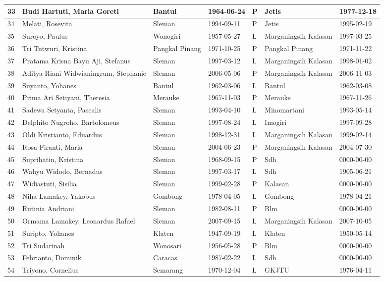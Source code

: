 \begin{longtable}{|m{5mm}|m{45mm}|m{20mm}|m{20mm}|m{5mm}|m{25mm}|m{20mm}|}
	33&Budi Hartuti, Maria Goreti&Bantul&1964-06-24&P&Jetis&1977-12-18\\ \hline 
	34&Melati, Rosevita&Sleman&1994-09-11&P&Jetis&1995-02-19\\ \hline 
	35&Suroyo, Paulus&Wonogiri&1957-05-27&L&Marganingsih Kalasan&1997-03-25\\ \hline 
	36&Tri Tutwuri, Kristina&Pangkal Pinang&1971-10-25&P&Pangkal Pinang&1971-11-22\\ \hline 
	37&Pratama Krisna Bayu Aji, Stefanus&Sleman&1997-03-12&L&Marganingsih Kalasan&1998-01-02\\ \hline 
	38&Aditya Riani Widwianingrum, Stephanie&Sleman&2006-05-06&P&Marganingsih Kalasan&2006-11-03\\ \hline 
	39&Suyanto, Yohanes&Bantul&1962-03-06&L&Bantul&1962-03-08\\ \hline 
	40&Prima Ari Setiyani, Theresia&Merauke&1967-11-03&P&Merauke&1967-11-26\\ \hline 
	41&Sadewa Setyanta, Pascalis&Sleman&1993-04-10&L&Minomartani&1993-05-14\\ \hline 
	42&Delphito Nugroho, Bartolomeus&Sleman&1997-08-24&L&Imogiri&1997-09-28\\ \hline 
	43&Oldi Kristianto, Eduardus&Sleman&1998-12-31&L&Marganingsih Kalasan&1999-02-14\\ \hline 
	44&Rosa Firanti, Maria&Sleman&2004-06-23&P&Marganingsih Kalasan&2004-07-30\\ \hline 
	45&Suprihatin, Kristina&Sleman&1968-09-15&P&Sdh&0000-00-00\\ \hline 
	46&Wahyu Widodo, Bernadus&Sleman&1997-03-17&L&Sdh&1905-06-21\\ \hline 
	47&Widiastuti, Sisilia&Sleman&1999-02-28&P&Kalasan&0000-00-00\\ \hline 
	48&Niha Lamakey, Yakobus&Gombong&1978-04-05&L&Gombong&1978-04-21\\ \hline 
	49&Rutinia Andriani&Sleman&1982-08-11&P&Blm&0000-00-00\\ \hline 
	50&Ormama Lamakey, Leonardus Rafael&Sleman&2007-09-15&L&Marganingsih Kalasan&2007-10-05\\ \hline 
	51&Suripto, Yohanes&Klaten&1947-09-19&L&Klaten&1950-05-14\\ \hline 
	52&Tri Sudarinah&Wonosari&1956-05-28&P&Blm&0000-00-00\\ \hline 
	53&Febrianto, Dominik&Caracas&1987-02-22&L&Sdh&0000-00-00\\ \hline 
	54&Triyono, Cornelius&Semarang&1970-12-04&L&GKJTU&1976-04-11\\ \hline 

\end{longtable}
